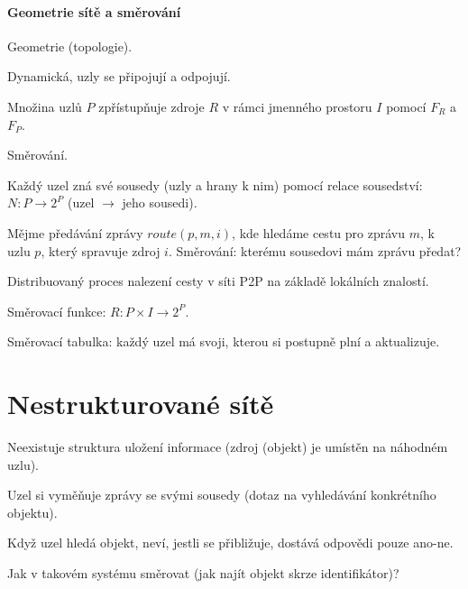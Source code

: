 \paragraph*{Geometrie sítě a směrování} \begin{compactitem}

    \item Geometrie (topologie). \begin{compactitem}
        \item Dynamická, uzly se připojují a odpojují.
        \item Množina uzlů $P$ zpřístupňuje zdroje $R$ v rámci jmenného prostoru $I$ pomocí $F_R$ a $F_P$.
    \end{compactitem}

    \item Směrování. \begin{compactitem}
        \item Každý uzel zná své sousedy (uzly a hrany k nim) pomocí relace sousedství: $N : P \rightarrow 2^P$ (uzel $\rightarrow$ jeho sousedi).
        \item Mějme předávání zprávy $route(p, m, i)$, kde hledáme cestu pro zprávu $m$, k uzlu $p$, který spravuje zdroj $i$. Směrování: kterému sousedovi mám zprávu předat?
        \item Distribuovaný proces nalezení cesty v síti P2P na základě lokálních znalostí.
        \item Směrovací funkce: $R : P \times I \rightarrow 2^P$.
        \item Směrovací tabulka: každý uzel má svoji, kterou si postupně plní a aktualizuje.
    \end{compactitem}

\end{compactitem}


\section{Nestrukturované sítě}

\begin{compactitem}
    \item Neexistuje struktura uložení informace (zdroj (objekt) je umístěn na náhodném uzlu).
    \item Uzel si vyměňuje zprávy se svými sousedy (dotaz na vyhledávání konkrétního objektu).
    \item Když uzel hledá objekt, neví, jestli se přibližuje, dostává odpovědi pouze ano-ne.
    \item Jak v takovém systému směrovat (jak najít objekt skrze identifikátor)?
\end{compactitem}

